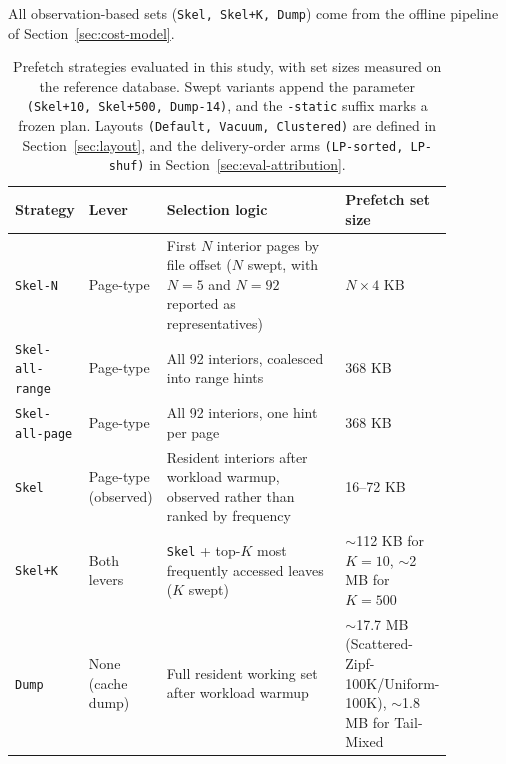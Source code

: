 \documentclass[sigconf, nonacm]{acmart}
\begin{document}
All observation-based sets (\texttt{Skel, Skel+K, Dump}) come from the offline pipeline of Section~\ref{sec:cost-model}.

\begin{table}[htbp]
\centering
\caption{Prefetch strategies evaluated in this study, with set sizes measured on the reference database. Swept variants append the parameter \texttt{(Skel+10, Skel+500, Dump-14)}, and the \texttt{-static} suffix marks a frozen plan. Layouts \texttt{(Default, Vacuum, Clustered)} are defined in Section~\ref{sec:layout}, and the delivery-order arms \texttt{(LP-sorted, LP-shuf)} in Section~\ref{sec:eval-attribution}.}
\begin{tabular}{p{0.1\linewidth} p{0.12\linewidth} p{0.45\linewidth} p{0.20\linewidth}}
\toprule
\textbf{Strategy} & \textbf{Lever} & \textbf{Selection logic} & \textbf{Prefetch set size} \\
\midrule
\texttt{Skel-N} & Page-type & First $N$ interior pages by file offset ($N$ swept, with $N=5$ and $N=92$ reported as representatives) & $N \times 4$ KB \\
\texttt{Skel-all-range} & Page-type & All 92 interiors, coalesced into range hints & 368 KB \\
\texttt{Skel-all-page} & Page-type & All 92 interiors, one hint per page & 368 KB \\
\texttt{Skel} & Page-type (observed) & Resident interiors after workload warmup, observed rather than ranked by frequency & 16--72 KB \\
\texttt{Skel+K} & Both levers & \texttt{Skel} + top-$K$ most frequently accessed leaves ($K$ swept) & $\sim$112 KB for $K=10$, $\sim$2 MB for $K=500$ \\
\texttt{Dump} & None (cache dump) & Full resident working set after workload warmup & $\sim$17.7 MB (Scattered-Zipf-100K/Uniform-100K), $\sim$1.8 MB for Tail-Mixed \\
\bottomrule
\end{tabular}
\label{tab:strategies}
\end{table}
\end{document}
